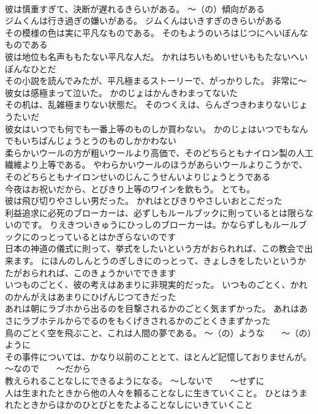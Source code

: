 \documentclass[8pt]{extreport}
\begin{document}
\begin{CJK}{UTF8}{min}
\\	彼は慎重すぎて、決断が遅れるきらいがある。	～（の）傾向がある
\\	ジムくんは行き過ぎの嫌いがある。	ジムくんはいきすぎのきらいがある 
\\	その模様の色は実に平凡なものである。	そのもようのいろはじつにへいぼんなものである 
\\	彼は地位も名声ももたない平凡な人だ。	かれはちいもめいせいももたないへいぼんなひとだ 
\\	その小説を読んでみたが、平凡極まるストーリーで、がっかりした。	非常に～
\\	彼女は感極まって泣いた。	かのじょはかんきわまってないた 
\\	その机は、乱雑極まりない状態だ。	そのつくえは、らんざつきわまりないじょうたいだ 
\\	彼女はいつでも何でも一番上等のものしか買わない。	かのじょはいつでもなんでもいちばんじょうとうのものしかかわない 
\\	柔らかいウールの方が粗いウールより高価で、そのどちらともナイロン製の人工繊維より上等である。	やわらかいウールのほうがあらいウールよりこうかで、そのどちらともナイロンせいのじんこうせんいよりじょうとうである 
\\	今夜はお祝いだから、とびきり上等のワインを飲もう。	とても。
\\	彼は飛び切りやさしい男だった。	かれはとびきりやさしいおとこだった 
\\	利益追求に必死のブローカーは、必ずしもルールブックに則っているとは限らないのです。	りえきついきゅうにひっしのブローカーは。かならずしもルールブックにのっとっているとはかぎらないのです 
\\	日本の神道の儀式に則って、挙式をしたいという方がおられれば、この教会で出来ます。	にほんのしんとうのぎしきにのっとって、きょしきをしたいというかたがおられれば、このきょうかいでできます 
\\	いつものごとく、彼の考えはあまりに非現実的だった。	いつものごとく、かれのかんがえはあまりにひげんじつてきだった 
\\	あれは朝にラブホから出るのを目撃されるかのごとく気まずかった。	あれはあさにラブホテルからでるのをもくげきされるかのごとくきまずかった 
\\	鳥のごとく空を飛ぶこと、これは人間の夢である。	～（の）ような　　～（の）ように
\\	その事件については、かなり以前のこととて、ほとんど記憶しておりませんが。	～なので　　～だから
\\	教えられることなしにできるようになる。	～しないで　　～せずに
\\	人は生まれたときから他の人々を頼ることなしに生きていくこと。	ひとはうまれたときからほかのひとびとをたよることなしにいきていくこと 

\end{CJK}
\end{document}
